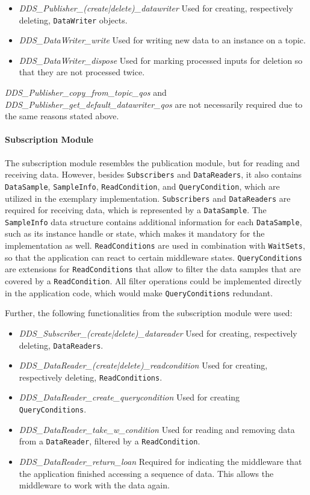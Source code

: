 \begin{itemize}
\item \textit{DDS\_Publisher\_(create|delete)\_datawriter} Used for creating, respectively deleting, \texttt{DataWriter} objects.
\item \textit{DDS\_DataWriter\_write} Used for writing new data to an instance on a  topic.
\item \textit{DDS\_DataWriter\_dispose} Used for marking processed inputs for deletion so that they are not processed twice.
\end{itemize}

\textit{DDS\_Publisher\_copy\_from\_topic\_qos} and \textit{DDS\_Publisher\_get\_default\_datawriter\_qos} are not necessarily required due to the same reasons stated above.

\paragraph{Subscription Module}
The subscription module resembles the publication module, but for reading and receiving data.
However, besides \texttt{Subscribers} and \texttt{DataReaders}, it also contains \texttt{DataSample}, \texttt{SampleInfo}, \texttt{ReadCondition}, and \texttt{QueryCondition}, which are utilized in the exemplary implementation.
\texttt{Subscribers} and \texttt{DataReaders} are required for receiving data, which is represented by a \texttt{DataSample}.
The \texttt{SampleInfo} data structure contains additional information for each \texttt{DataSample}, such as its instance handle or state, which makes it mandatory for the implementation as well.
\texttt{ReadConditions} are used in combination with \texttt{WaitSets}, so that the application can react to certain middleware states.
\texttt{QueryConditions} are extensions for \texttt{ReadConditions} that allow to filter the data samples that are covered by a \texttt{ReadCondition}.
All filter operations could be implemented directly in the application code, which would make \texttt{QueryConditions} redundant.

Further, the following functionalities from the subscription module were used:

\begin{itemize}
\item \textit{DDS\_Subscriber\_(create|delete)\_datareader} Used for creating, respectively deleting, \texttt{DataReaders}.
\item \textit{DDS\_DataReader\_(create|delete)\_readcondition} Used for creating, respectively deleting, \texttt{ReadConditions}.
\item \textit{DDS\_DataReader\_create\_querycondition} Used for creating \texttt{QueryConditions}.
\item \textit{DDS\_DataReader\_take\_w\_condition} Used for reading and removing data from a \texttt{DataReader}, filtered by a \texttt{ReadCondition}.
\item \textit{DDS\_DataReader\_return\_loan} Required for indicating the middleware that the application finished accessing a sequence of data. This allows the middleware to work with the data again.
\end{itemize}

